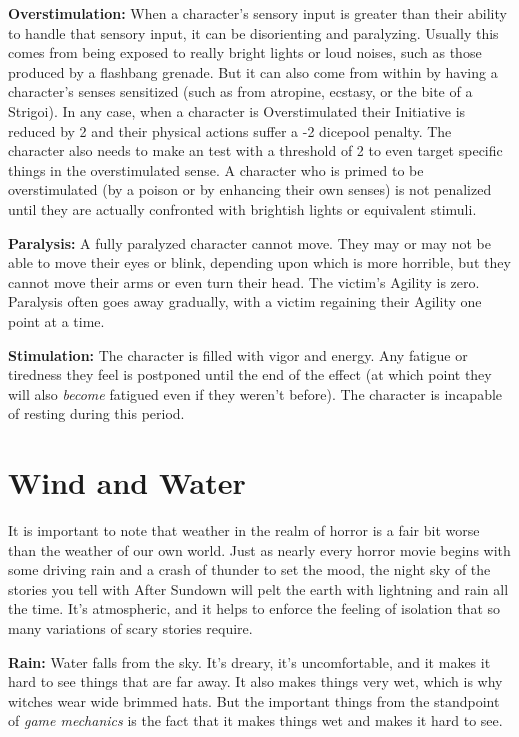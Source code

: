 \textbf{Overstimulation:} When a character's sensory input is greater than their ability to handle that sensory input, it can be disorienting and paralyzing. Usually this comes from being exposed to really bright lights or loud noises, such as those produced by a flashbang grenade. But it can also come from within by having a character's senses sensitized (such as from atropine, ecstasy, or the bite of a Strigoi). In any case, when a character is Overstimulated their Initiative is reduced by 2 and their physical actions suffer a -2 dicepool penalty. The character also needs to make an  test with a threshold of 2 to even target specific things in the overstimulated sense. A character who is primed to be overstimulated (by a poison or by enhancing their own senses) is not penalized until they are actually confronted with brightish lights or equivalent stimuli.

\textbf{Paralysis:} A fully paralyzed character cannot move. They may or may not be able to move their eyes or blink, depending upon which is more horrible, but they cannot move their arms or even turn their head. The victim's Agility is zero. Paralysis often goes away gradually, with a victim regaining their Agility one point at a time.

\textbf{Stimulation:} The character is filled with vigor and energy. Any fatigue or tiredness they feel is postponed until the end of the effect (at which point they will also \textit{become} fatigued even if they weren't before). The character is incapable of resting during this period.

\section{Wind and Water}

It is important to note that weather in the realm of horror is a fair bit worse than the weather of our own world. Just as nearly every horror movie begins with some driving rain and a crash of thunder to set the mood, the night sky of the stories you tell with After Sundown will pelt the earth with lightning and rain all the time. It's atmospheric, and it helps to enforce the feeling of isolation that so many variations of scary stories require.

\textbf{Rain:} Water falls from the sky. It's dreary, it's uncomfortable, and it makes it hard to see things that are far away. It also makes things very wet, which is why witches wear wide brimmed hats. But the important things from the standpoint of \textit{game mechanics} is the fact that it makes things wet and makes it hard to see.

